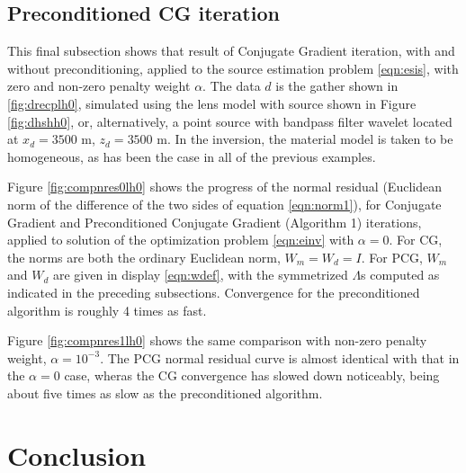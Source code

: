 \documentclass[georeport,12pt]{geophysics}
\begin{document}
\subsection{Preconditioned CG iteration}
This final subsection shows that result of Conjugate Gradient
iteration, with and without preconditioning, applied to the source
estimation problem \ref{eqn:esis}, with zero and non-zero penalty
weight $\alpha$. The data $d$ is the gather shown in
\ref{fig:drecplh0}, simulated using the lens model with source shown
in Figure \ref{fig:dhshh0}, or, alternatively, a point source with
bandpass filter wavelet located at $x_d=3500$ m, $z_d=3500$ m. In the inversion,
the material model is taken to be homogeneous, as has been the case in
all of the previous examples. 

Figure \ref{fig:compnres0lh0} shows the progress of the normal residual
(Euclidean norm of the difference of the two sides of equation \ref{eqn:norm1}),
for Conjugate Gradient and Preconditioned Conjugate Gradient
(Algorithm 1) iterations, applied to solution of the optimization
problem \ref{eqn:einv} with $\alpha=0$. For CG, the norms are both the ordinary
Euclidean norm, $W_m=W_d=I$. For PCG, $W_m$ and $W_d$ are given in
display \ref{eqn:wdef}, with the symmetrized $\Lambda$s computed as
indicated in the preceding subsections. Convergence for the
preconditioned algorithm is roughly 4 times as fast.


Figure \ref{fig:compnres1lh0} shows the same comparison with non-zero
penalty weight, $\alpha=10^{-3}$. The PCG normal residual curve is
almost identical with that in the $\alpha=0$ case, wheras the CG
convergence has slowed down noticeably, being about five times as slow
as the preconditioned algorithm.


\section{Conclusion}
\end{document}
